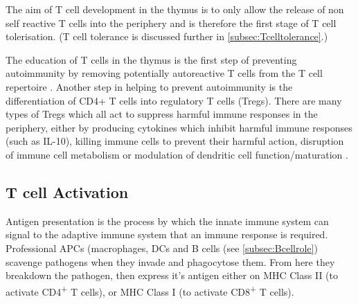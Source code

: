 The aim of T cell development in the thymus is to only allow the release of non self reactive T cells into the periphery and is therefore the first stage of T cell tolerisation. 
(T cell tolerance is discussed further in \cref{subsec:Tcelltolerance}.)

The education of T cells in the thymus is the first step of preventing autoimmunity by removing potentially autoreactive T cells from the T cell repertoire \citep{Walker2002}.
Another step in helping to prevent autoimmunity is the differentiation of CD4+ T cells into regulatory T cells (Tregs).
There are many types of Tregs which all act to suppress harmful immune responses in the periphery, either by producing cytokines which inhibit harmful immune responses (such as IL-10), killing immune cells to prevent their harmful action, disruption of immune cell metabolism or modulation of dendritic cell function/maturation \citep{Vignali2008}. 


\subsection{T cell Activation}
\label{subsec:Tcellactivation}


Antigen presentation is the process by which the innate immune system can signal to the adaptive immune system that an immune response is required.
Professional APCs (macrophages, DCs and B cells (see \cref{subsec:Bcellrole}) scavenge pathogens when they invade and phagocytose them.
From here they breakdown the pathogen, then express it's antigen either on MHC Class II (to activate CD4\textsuperscript{+} T cells), or MHC Class I (to activate CD8\textsuperscript{+} T cells).


